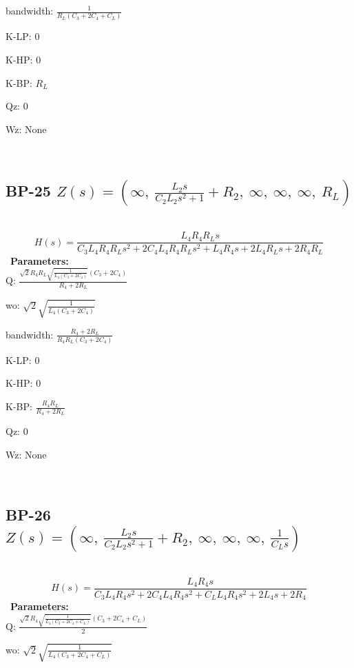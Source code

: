 \documentclass{article}
\begin{document}
bandwidth: $\frac{1}{R_{L} \left(C_{3} + 2 C_{4} + C_{L}\right)}$\ 

K-LP: $0$\ 

K-HP: $0$\ 

K-BP: $R_{L}$\ 

Qz: $0$\ 

Wz: $\text{None}$\ 

\ 

\subsection{BP-25 $Z(s) = \left( \infty, \  \frac{L_{2} s}{C_{2} L_{2} s^{2} + 1} + R_{2}, \  \infty, \  \infty, \  \infty, \  R_{L}\right)$ } \ 
\textbf{\[H(s) = \frac{L_{4} R_{4} R_{L} s}{C_{3} L_{4} R_{4} R_{L} s^{2} + 2 C_{4} L_{4} R_{4} R_{L} s^{2} + L_{4} R_{4} s + 2 L_{4} R_{L} s + 2 R_{4} R_{L}}\] } \ 
\textbf{Parameters:}\\ 

Q: $\frac{\sqrt{2} R_{4} R_{L} \sqrt{\frac{1}{L_{4} \left(C_{3} + 2 C_{4}\right)}} \left(C_{3} + 2 C_{4}\right)}{R_{4} + 2 R_{L}}$\ 

wo: $\sqrt{2} \sqrt{\frac{1}{L_{4} \left(C_{3} + 2 C_{4}\right)}}$\ 

bandwidth: $\frac{R_{4} + 2 R_{L}}{R_{4} R_{L} \left(C_{3} + 2 C_{4}\right)}$\ 

K-LP: $0$\ 

K-HP: $0$\ 

K-BP: $\frac{R_{4} R_{L}}{R_{4} + 2 R_{L}}$\ 

Qz: $0$\ 

Wz: $\text{None}$\ 

\ 

\subsection{BP-26 $Z(s) = \left( \infty, \  \frac{L_{2} s}{C_{2} L_{2} s^{2} + 1} + R_{2}, \  \infty, \  \infty, \  \infty, \  \frac{1}{C_{L} s}\right)$ } \ 
\textbf{\[H(s) = \frac{L_{4} R_{4} s}{C_{3} L_{4} R_{4} s^{2} + 2 C_{4} L_{4} R_{4} s^{2} + C_{L} L_{4} R_{4} s^{2} + 2 L_{4} s + 2 R_{4}}\] } \ 
\textbf{Parameters:}\\ 

Q: $\frac{\sqrt{2} R_{4} \sqrt{\frac{1}{L_{4} \left(C_{3} + 2 C_{4} + C_{L}\right)}} \left(C_{3} + 2 C_{4} + C_{L}\right)}{2}$\ 

wo: $\sqrt{2} \sqrt{\frac{1}{L_{4} \left(C_{3} + 2 C_{4} + C_{L}\right)}}$\ 
\end{document}

